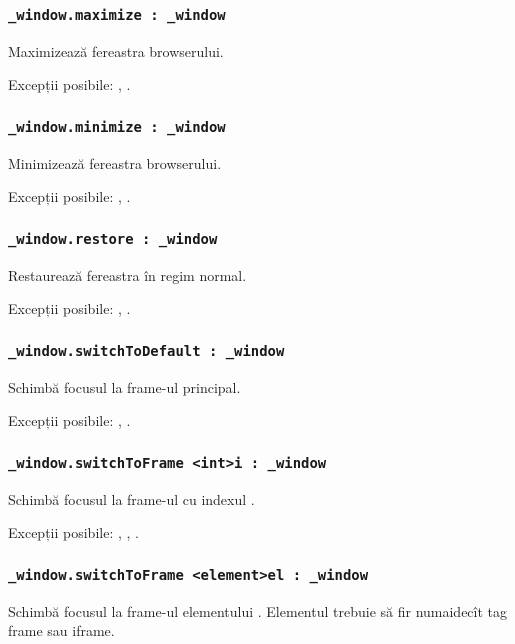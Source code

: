 \subsubsection{\lstinline|_window.maximize : _window|}

Maximizează fereastra browserului.

Excepții posibile: , .

\subsubsection{\lstinline|_window.minimize : _window|}

Minimizează fereastra browserului.

Excepții posibile: , .

\subsubsection{\lstinline|_window.restore : _window|}

Restaurează fereastra în regim normal.

Excepții posibile: , .

\subsubsection{\lstinline|_window.switchToDefault : _window|}

Schimbă focusul la frame-ul principal.

Excepții posibile: , .

\subsubsection{\lstinline|_window.switchToFrame <int>i : _window|}

Schimbă focusul la frame-ul cu indexul .

Excepții posibile: , , .

\subsubsection{\lstinline|_window.switchToFrame <element>el : _window|}

Schimbă focusul la frame-ul elementului . Elementul trebuie să fir numaidecît tag frame sau iframe.

